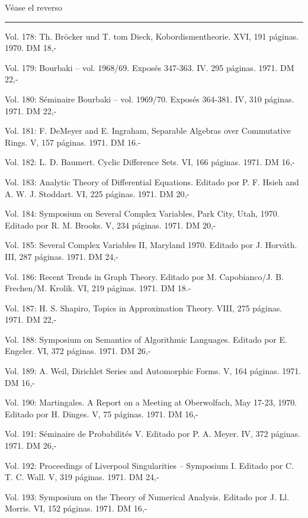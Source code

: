 Véase el reverso



\noindent\rule{\linewidth}{0.4pt}

Vol. 178: Th. Bröcker und T. tom Dieck, Kobordismentheorie. XVI, 191 páginas. 1970. DM 18,-

Vol. 179:  Bourbaki -- vol. 1968/69. Exposés 347-363. IV. 295 páginas. 1971. DM 22,-

Vol. 180: Séminaire Bourbaki -- vol. 1969/70. Exposés 364-381. IV, 310 páginas. 1971. DM 22,-

Vol. 181: F. DeMeyer and E. Ingraham, Separable Algebras over Commutative Rings. V, 157 páginas. 1971. DM 16.-

Vol. 182: L. D. Baumert. Cyclic Difference Sets. VI, 166 páginas. 1971. DM 16,-

Vol. 183: Analytic Theory of Differential Equations. Editado por P. F. Hsieh and A. W. J. Stoddart. VI, 225 páginas. 1971. DM 20,-

Vol. 184: Symposium on Several Complex Variables, Park City, Utah, 1970. Editado por R. M. Brooks. V, 234 páginas. 1971. DM 20,-

Vol. 185: Several Complex Variables II, Maryland 1970. Editado por J. Horváth. III, 287 páginas. 1971. DM 24,-

Vol. 186: Recent Trends in Graph Theory. Editado por M. Capobianco/J. B. Frechen/M. Krolik. VI, 219 páginas. 1971. DM 18.-

Vol. 187: H. S. Shapiro, Topics in Approximation Theory. VIII, 275 páginas. 1971. DM 22,-

Vol. 188: Symposium on Semantics of Algorithmic Languages. Editado por E. Engeler. VI, 372 páginas. 1971. DM 26,-

Vol. 189: A. Weil, Dirichlet Series and Automorphic Forms. V, 164 páginas. 1971. DM 16,-

Vol. 190: Martingales. A Report on a Meeting at Oberwolfach, May 17-23, 1970. Editado por H. Dinges. V, 75 páginas. 1971. DM 16,-

Vol. 191: Séminaire de Probabilités V. Editado por P. A. Meyer. IV, 372 páginas. 1971. DM 26,-

Vol. 192: Proceedings of Liverpool Singularities -- Symposium I. Editado por C. T. C. Wall. V, 319 páginas. 1971. DM 24,-

Vol. 193: Symposium on the Theory of Numerical Analysis. Editado por J. Ll. Morris. VI, 152 páginas. 1971. DM 16,-

